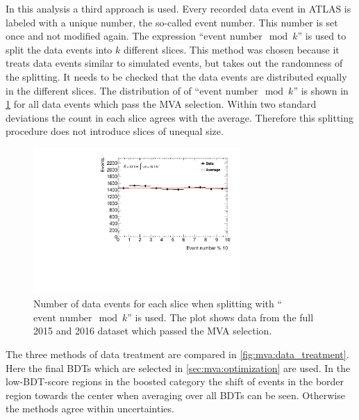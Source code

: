 In this analysis a third approach is used.
Every recorded data event in ATLAS is labeled with a unique number, the so-called event number.
This number is set once and not modified again.
The expression ``$\text{event number} \mod k$'' is used to split the data events into $k$ different slices.
This method was chosen because it treats data events similar to simulated events, but takes out the randomness of the splitting.
It needs to be checked that the data events are distributed equally in the different slices.
The distribution of of ``$\text{event number} \mod k$'' is shown in \cref{fig:mva:event_number_mod} for all
data events which pass the MVA selection.
Within two standard deviations the count in each slice agrees with the average.
Therefore this splitting procedure does not introduce slices of unequal size.

\begin{figure}[htb]
    \centering
    \includegraphics[width=0.7\textwidth]{./plots/mva/data_treatment/event_number_mod.pdf}
    \caption{Number of data events for each slice when splitting with ``$\text{event number} \mod k$'' is used.
             The plot shows data from the full 2015 and 2016 dataset which passed the MVA selection.}\label{fig:mva:event_number_mod}
\end{figure}

The three methods of data treatment are compared in \cref{fig:mva:data_treatment}.
Here the final BDTs which are selected in \cref{sec:mva:optimization} are used.
In the low-BDT-score regions in the boosted category the shift of events in the border region towards
the center when averaging over all BDTs can be seen.
Otherwise the methods agree within uncertainties.

